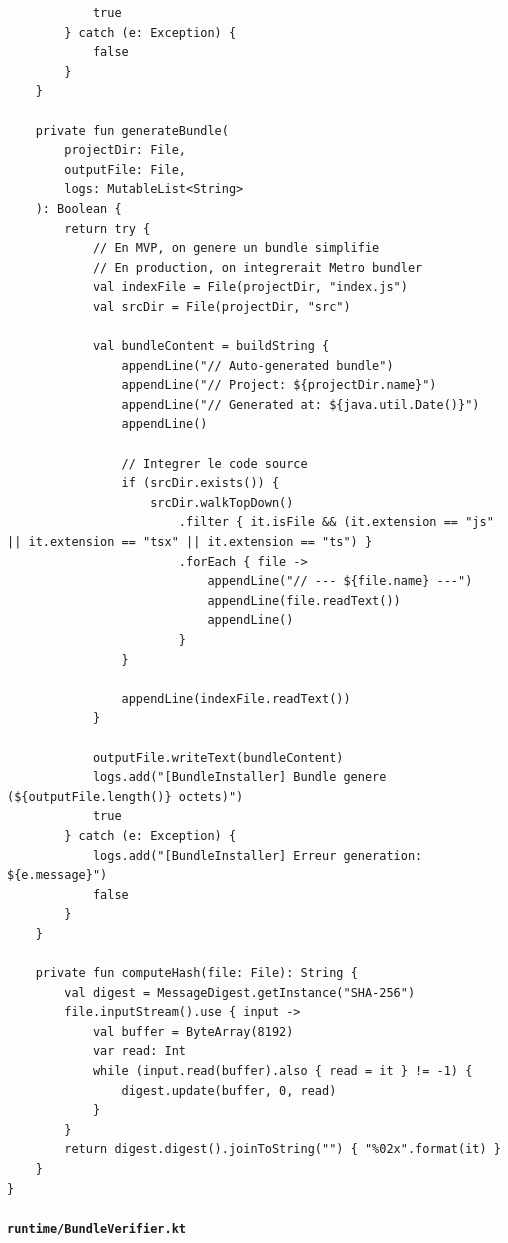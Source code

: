 \documentclass[11pt]{article}
\begin{document}
\begin{verbatim}
            true
        } catch (e: Exception) {
            false
        }
    }

    private fun generateBundle(
        projectDir: File,
        outputFile: File,
        logs: MutableList<String>
    ): Boolean {
        return try {
            // En MVP, on genere un bundle simplifie
            // En production, on integrerait Metro bundler
            val indexFile = File(projectDir, "index.js")
            val srcDir = File(projectDir, "src")

            val bundleContent = buildString {
                appendLine("// Auto-generated bundle")
                appendLine("// Project: ${projectDir.name}")
                appendLine("// Generated at: ${java.util.Date()}")
                appendLine()

                // Integrer le code source
                if (srcDir.exists()) {
                    srcDir.walkTopDown()
                        .filter { it.isFile && (it.extension == "js" || it.extension == "tsx" || it.extension == "ts") }
                        .forEach { file ->
                            appendLine("// --- ${file.name} ---")
                            appendLine(file.readText())
                            appendLine()
                        }
                }

                appendLine(indexFile.readText())
            }

            outputFile.writeText(bundleContent)
            logs.add("[BundleInstaller] Bundle genere (${outputFile.length()} octets)")
            true
        } catch (e: Exception) {
            logs.add("[BundleInstaller] Erreur generation: ${e.message}")
            false
        }
    }

    private fun computeHash(file: File): String {
        val digest = MessageDigest.getInstance("SHA-256")
        file.inputStream().use { input ->
            val buffer = ByteArray(8192)
            var read: Int
            while (input.read(buffer).also { read = it } != -1) {
                digest.update(buffer, 0, read)
            }
        }
        return digest.digest().joinToString("") { "%02x".format(it) }
    }
}
\end{verbatim}

\paragraph{\texttt{runtime/BundleVerifier.kt}}
\end{document}
